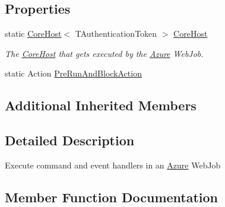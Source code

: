 \subsection*{Properties}
\begin{DoxyCompactItemize}
\item 
static \hyperlink{classCqrs_1_1Hosts_1_1CoreHost}{Core\+Host}$<$ T\+Authentication\+Token $>$ \hyperlink{classCqrs_1_1Azure_1_1WebJobs_1_1CqrsJobHost_a840ffdd7a98109cce3efd3ae3562941e_a840ffdd7a98109cce3efd3ae3562941e}{Core\+Host}
\begin{DoxyCompactList}\small\item\em The \hyperlink{classCqrs_1_1Azure_1_1WebJobs_1_1CqrsJobHost_a840ffdd7a98109cce3efd3ae3562941e_a840ffdd7a98109cce3efd3ae3562941e}{Core\+Host} that gets executed by the \hyperlink{namespaceCqrs_1_1Azure}{Azure} Web\+Job. \end{DoxyCompactList}\item 
static Action \hyperlink{classCqrs_1_1Azure_1_1WebJobs_1_1CqrsJobHost_afd124af2c14bb654b6fefd6842ceebeb_afd124af2c14bb654b6fefd6842ceebeb}{Pre\+Run\+And\+Block\+Action}
\end{DoxyCompactItemize}
\subsection*{Additional Inherited Members}


\subsection{Detailed Description}
Execute command and event handlers in an \hyperlink{namespaceCqrs_1_1Azure}{Azure} Web\+Job 



\subsection{Member Function Documentation}
\mbox{\label{classCqrs_1_1Azure_1_1WebJobs_1_1CqrsJobHost_a836ef65628bb4b63942beedfb17f1269_a836ef65628bb4b63942beedfb17f1269}} 
